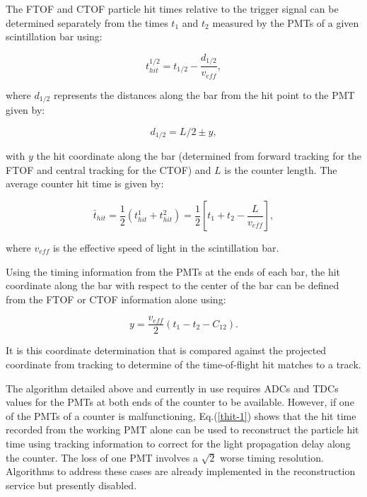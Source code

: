 The FTOF and CTOF particle hit times relative to the trigger signal can be determined separately from the times
$t_1$ and $t_2$ measured by the PMTs of a given scintillation bar using:

\begin{equation}
\label{thit-1}
t_{hit}^{1/2} = t_{1/2} - \frac{d_{1/2}}{v_{eff}},
\end{equation}

\noindent
where $d_{1/2}$ represents the distances along the bar from the hit point to the PMT given by:

\begin{equation}
d_{1/2}= L/2 \pm y,
\end{equation}

\noindent
with $y$ the hit coordinate along the bar (determined from forward tracking for the FTOF and central tracking
for the CTOF) and $L$ is the counter length. The average counter hit time is given by:

\begin{equation}
\label{thit-2}
\bar{t}_{hit} = \frac{1}{2} ( t_{hit}^1 + t_{hit}^2 ) = \frac{1}{2} \left[ t_1 + t_2 - \frac{L}{v_{eff}} \right],
\end{equation}

\noindent
where $v_{eff}$ is the effective speed of light in the scintillation bar.

Using the timing information from the PMTs at the ends of each bar, the hit coordinate along the bar with respect to the center of the bar can be defined from the FTOF or CTOF information alone using:

\begin{equation}
\label{tof-coor}
y = \frac{v_{eff}}{2} (t_1 - t_2 - C_{12}).
\end{equation}

\noindent
It is this coordinate determination that is compared against the projected coordinate from tracking to
determine of the time-of-flight hit matches to a track.

The algorithm detailed above and currently in use requires ADCs and TDCs values for the PMTs at both ends of the counter to be available. However, if one of the PMTs of a counter is malfunctioning, Eq.(\ref{thit-1}) shows that the hit time recorded from the working PMT alone can be used to reconstruct the particle hit time using tracking information to correct for the light propagation delay
along the counter. The loss of one PMT involves a $\sqrt{2}$ worse timing resolution. Algorithms to address these cases are already implemented in the reconstruction service but presently disabled.


